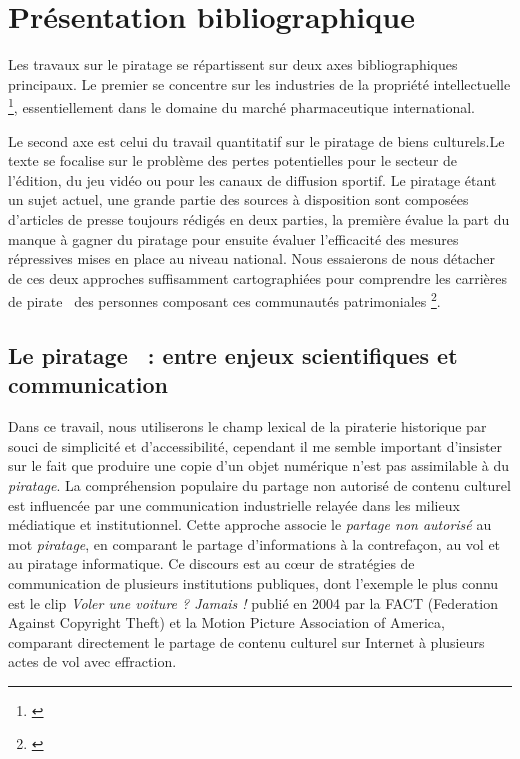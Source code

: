 \section*{Présentation bibliographique}

Les travaux sur le piratage se répartissent sur deux axes bibliographiques principaux. Le premier se concentre sur les industries de la propriété intellectuelle \footnote{\cite{liang_piratage_2014}}, essentiellement dans le domaine du marché pharmaceutique international. 

Le second axe est celui du travail quantitatif sur le piratage de biens culturels.Le texte se focalise sur le problème des pertes potentielles pour le secteur de l'édition, du jeu vidéo ou pour les canaux de diffusion sportif. Le piratage étant un sujet actuel, une grande partie des sources à disposition sont composées d'articles de presse toujours rédigés en deux parties, la première évalue la part du manque à gagner du piratage pour ensuite évaluer l'efficacité des mesures répressives mises en place au niveau national. Nous essaierons de nous détacher de ces deux approches suffisamment cartographiées pour comprendre les \guillemetleft carrières de pirate \guillemetright ~des personnes composant ces communautés patrimoniales \footnote{\cite{galluzzo_longevite_2021}}.

\subsection*{Le \guillemetleft piratage \guillemetright~: entre enjeux scientifiques et communication  }%

Dans ce travail, nous utiliserons le champ lexical de la piraterie historique par souci de simplicité et d’accessibilité, cependant il me semble important d'insister sur le fait que produire une copie d'un objet numérique n'est pas assimilable à du \textit{piratage}. La compréhension populaire du partage non autorisé de contenu culturel est influencée par une communication industrielle relayée dans les milieux médiatique et institutionnel. Cette approche associe le \textit{partage non autorisé} au mot \textit{piratage}, en comparant le partage d'informations à la contrefaçon, au vol et au piratage informatique. Ce discours est au cœur de stratégies de communication de plusieurs institutions publiques, dont l'exemple le plus connu est le clip \textit{Voler une voiture ? Jamais !} publié en 2004 par la FACT (Federation Against Copyright Theft) et la Motion Picture Association of America, comparant directement le partage de contenu culturel sur Internet à plusieurs actes de vol avec effraction. 

